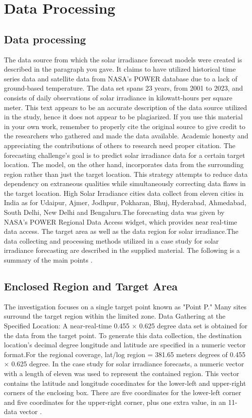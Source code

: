 \documentclass[a4paper,fleqn]{cas-sc}
\begin{document}
  \section{Data Processing}
  \subsection{Data processing}
  The data source from which the solar irradiance forecast models were created is described in the paragraph you
  gave. It claims to have utilized historical time series data and satellite data from NASA’s POWER database due to a lack of ground-based temperature. The data set spans 23 years, from 2001 to 2023, and consists of daily observations of solar irradiance in kilowatt-hours per square meter. This text appears to be an accurate description of the data source utilized in the study, hence it does not appear to be plagiarized. If you use this material in your own work, remember to properly cite the original source to give credit to the researchers who gathered and made the data available. Academic honesty and appreciating the contributions of others to research need proper citation. The forecasting challenge’s goal is to predict solar irradiance data for a certain target location. The model, on the other hand, incorporates data from the surrounding region rather than just the target location. This strategy attempts to reduce data dependency on extraneous qualities while simultaneously correcting data flaws in the target location. High Solar Irradiance cities data collect from eleven cities in India as for Udaipur, Ajmer, Jodhpur, Pokharan, Bhuj, Hyderabad, Ahmedabad, South Delhi, New Delhi and Bengaluru.The forecasting data was given by NASA’s POWER Regional Data Access widget, which provides near real-time data access. The target area as well as the data region for solar irradiance.The data collecting and processing methods utilized in a case study for solar irradiance forecasting are described in the supplied material. The following is a summary of the main points \cite{brahma2020solar}.
  
  \subsection{Enclosed Region and Target Area}
  The investigation focuses on a single target point known as "Point P." Many sites surround the target region within the limited zone. Data Gathering at the Specified Location: A near-real-time 0.455 × 0.625 degree data set is obtained for the data from the target point. To generate this data collection, the destination location’s decimal degree longitude and latitude are specified in a numeric vector format.For the regional coverage, lat/log region = 381.65 meters degrees of 0.455 × 0.625 degree. In the case study for solar irradiance forecasts, a numeric vector with a length of eleven was used to represent the contained region. This vector contains the latitude and longitude coordinates for the lower-left and upper-right corners of the enclosing box. There are five coordinates for the lower-left corner and five coordinates for the upper-right corner, plus one extra value, in an 11-data vector \cite{belmahdi2020one}.
  
\end{document}
